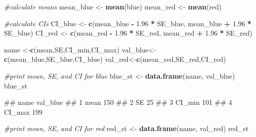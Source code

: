 \documentclass[
]{book}
\newenvironment{Shaded}{\begin{snugshade}}{\end{snugshade}}
\newcommand{\CommentTok}[1]{\textcolor[rgb]{0.56,0.35,0.01}{\textit{#1}}}
\newcommand{\FloatTok}[1]{\textcolor[rgb]{0.00,0.00,0.81}{#1}}
\newcommand{\FunctionTok}[1]{\textcolor[rgb]{0.13,0.29,0.53}{\textbf{#1}}}
\newcommand{\NormalTok}[1]{#1}
\newcommand{\OtherTok}[1]{\textcolor[rgb]{0.56,0.35,0.01}{#1}}
\newcommand{\SpecialCharTok}[1]{\textcolor[rgb]{0.81,0.36,0.00}{\textbf{#1}}}
\newcommand{\StringTok}[1]{\textcolor[rgb]{0.31,0.60,0.02}{#1}}
\begin{document}
\begin{Shaded}
\begin{Highlighting}[]
\CommentTok{\#calculate means}
\NormalTok{mean\_blue }\OtherTok{\textless{}{-}} \FunctionTok{mean}\NormalTok{(blue)}
\NormalTok{mean\_red }\OtherTok{\textless{}{-}} \FunctionTok{mean}\NormalTok{(red)}


\CommentTok{\#calculate CIs}
\NormalTok{CI\_blue }\OtherTok{\textless{}{-}} \FunctionTok{c}\NormalTok{(mean\_blue }\SpecialCharTok{{-}} \FloatTok{1.96} \SpecialCharTok{*}\NormalTok{ SE\_blue, mean\_blue }\SpecialCharTok{+} \FloatTok{1.96} \SpecialCharTok{*}\NormalTok{ SE\_blue)}
\NormalTok{CI\_red }\OtherTok{\textless{}{-}} \FunctionTok{c}\NormalTok{(mean\_red }\SpecialCharTok{{-}} \FloatTok{1.96} \SpecialCharTok{*}\NormalTok{ SE\_red, mean\_red }\SpecialCharTok{+} \FloatTok{1.96} \SpecialCharTok{*}\NormalTok{ SE\_red)}


\NormalTok{name }\OtherTok{\textless{}{-}}\FunctionTok{c}\NormalTok{(}\StringTok{\textquotesingle{}mean\textquotesingle{}}\NormalTok{,}\StringTok{\textquotesingle{}SE\textquotesingle{}}\NormalTok{,}\StringTok{\textquotesingle{}CI\_min\textquotesingle{}}\NormalTok{,}\StringTok{\textquotesingle{}CI\_max\textquotesingle{}}\NormalTok{)}
\NormalTok{val\_blue}\OtherTok{\textless{}{-}}\FunctionTok{c}\NormalTok{(mean\_blue,SE\_blue,CI\_blue)}
\NormalTok{val\_red}\OtherTok{\textless{}{-}}\FunctionTok{c}\NormalTok{(mean\_red,SE\_red,CI\_red)}

\CommentTok{\#print mean, SE, and CI for blue}
\NormalTok{blue\_st }\OtherTok{\textless{}{-}} \FunctionTok{data.frame}\NormalTok{(name, val\_blue)}
\NormalTok{blue\_st}
\end{Highlighting}
\end{Shaded}

\begin{Shaded}
\begin{Highlighting}[]
\NormalTok{\#\#     name val\_blue}
\NormalTok{\#\# 1   mean      150}
\NormalTok{\#\# 2     SE       25}
\NormalTok{\#\# 3 CI\_min      101}
\NormalTok{\#\# 4 CI\_max      199}
\end{Highlighting}
\end{Shaded}

\begin{Shaded}
\begin{Highlighting}[]
\CommentTok{\#print mean, SE, and CI for red}
\NormalTok{red\_st }\OtherTok{\textless{}{-}} \FunctionTok{data.frame}\NormalTok{(name, val\_red)}
\NormalTok{red\_st}
\end{Highlighting}
\end{Shaded}
\end{document}
